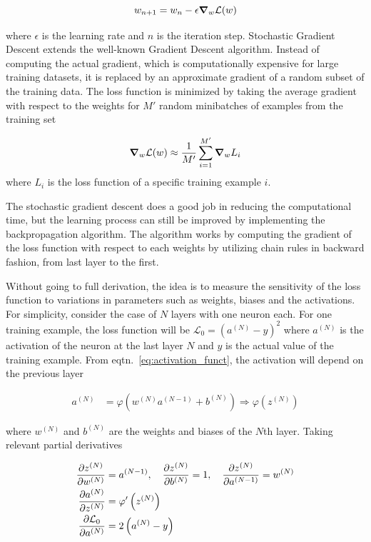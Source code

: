 \begin{equation}
    w_{n+1} = w_n - \epsilon  \grad_w \mathcal{L}(w)
\end{equation}

where $\epsilon$ is the learning rate and $n$ is the iteration step. Stochastic
Gradient Descent extends the well-known Gradient Descent algorithm. Instead of
computing the
actual gradient, which is computationally expensive for large training
datasets,  it is replaced
by an approximate gradient of a random subset of the training data. The loss
function is minimized by taking  the average gradient with respect to the
weights for $M'$ random minibatches of examples from the training set

\begin{align}
    \grad_w \mathcal{L}(w) \approx \frac{1}{M'} \sum_{i=1}^{M'} \grad_w L_i
\end{align}
where $L_i$ is the loss function of a specific training example $i$.

The stochastic gradient descent does a good job in reducing the computational
time, but the learning process can still be improved by implementing the
backpropagation algorithm. The algorithm works by computing the gradient of
the loss function with respect to each weights by utilizing chain rules in
backward fashion, from last layer to the first.

Without going to full derivation, the idea is to measure the sensitivity of the
loss function  to variations in  parameters such as weights,
biases and the activations.  For simplicity, consider the case of $N$ layers
with one neuron each. For one training example,  the loss function will be
$\mathcal{L}_0 = \left(a^{(N)} - y \right)^2$ where $a^{(N)}$ is the activation
of the
neuron at the last layer $N$ and $y$ is the actual value of the training
example. From eqtn.~\eqref{eq:activation_funct}, the activation will depend on
the previous layer

\begin{align}
    a^{(N)} & = \varphi \left( w^{(N)} a^{(N-1)} + b^{(N)} \right)
    \Longrightarrow
    \varphi
    \left( z^{(N)} \right)
\end{align}

where $w^{(N)}$ and $b^{(N)}$ are the weights and biases of the $N$th layer.
Taking relevant partial derivatives

\begin{align}
    \pdv{z^{(N)}}{w^{(N)}}       & = a^{(N-1)}, \quad \pdv{z^{(N)}}{b^{(N)}}
    =1,
    \quad \pdv{z^{(N)}}{a^{(N-1)}} = w^{(N)}                                 \\
    \pdv{a^{(N)}}{z^{(N)}}       & = \varphi'
    \left( z^{(N)} \right)                                                   \\
    \pdv{\mathcal{L}_0}{a^{(N)}} & = 2 \left(a^{(N)} - y \right)
\end{align}

